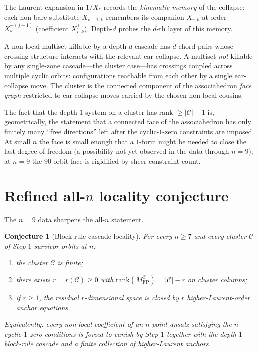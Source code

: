 \documentclass[11pt]{article}
\newtheorem{conj}[thm]{Conjecture}
\theoremstyle{definition}
\begin{document}
The Laurent expansion in $1/X_*$ records the \emph{kinematic
memory} of the collapse: each non-bare substitute $X_{r+1,k}$
remembers its companion $X_{r,k}$ at order $X_*^{-(j+1)}$
(coefficient $X_{r,k}^{j}$). Depth-$d$ probes the $d$-th layer of
this memory.

A non-local multiset killable by a depth-$d$ cascade has $d$
chord-pairs whose crossing structure interacts with the relevant
ear-collapse. A multiset \emph{not} killable by any single-zone
cascade---the cluster case---has crossings coupled across multiple
cyclic orbits: configurations reachable from each other by a
single ear-collapse move. The cluster is the connected component
of the associahedron \emph{face graph} restricted to ear-collapse
moves carried by the chosen non-local cousins.

The fact that the depth-$1$ system on a cluster has rank
$\ge|\mathcal C|-1$ is, geometrically, the statement that a
connected face of the associahedron has only finitely many
``free directions'' left after the cyclic-$1$-zero constraints are
imposed. At small $n$ the face is small enough that a $1$-form
might be needed to close the last degree of freedom (a possibility
not yet observed in the data through $n=9$); at $n=9$ the
$90$-orbit face is rigidified by sheer constraint count.

\section{Refined all-$n$ locality conjecture}\label{sec:conj}

The $n=9$ data sharpens the all-$n$ statement.

\begin{conj}[Block-rule cascade locality]\label{conj:blockrule}
For every $n\ge 7$ and every cluster $\mathcal C$ of Step-$1$
survivor orbits at $n$:
\begin{enumerate}[label=\textup{(\arabic*)}]
\item the cluster $\mathcal C$ is finite;
\item there exists $r=r(\mathcal C)\ge 0$ with
$\mathrm{rank}(M_{\mathrm{FP}}^{\mathcal C})=|\mathcal C|-r$ on
cluster columns;
\item if $r\ge 1$, the residual $r$-dimensional space is closed
by $r$ higher-Laurent-order anchor equations.
\end{enumerate}
Equivalently: every non-local coefficient of an $n$-point ansatz
satisfying the $n$ cyclic $1$-zero conditions is forced to vanish
by Step-$1$ together with the depth-$1$ block-rule cascade and a
finite collection of higher-Laurent anchors.
\end{conj}
\end{document}

